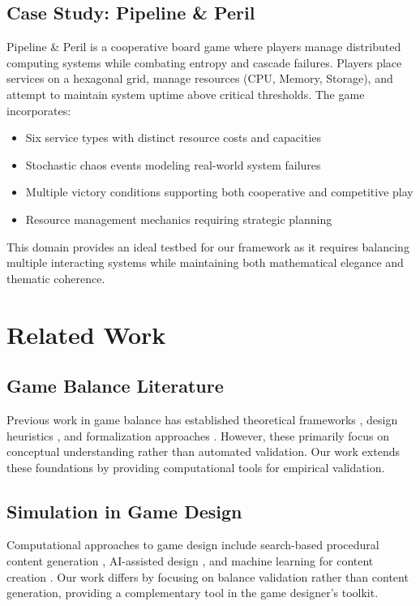 \documentclass[sigconf]{acmart}
\begin{document}
\subsection{Case Study: Pipeline \& Peril}

Pipeline \& Peril is a cooperative board game where players manage distributed computing systems while combating entropy and cascade failures. Players place services on a hexagonal grid, manage resources (CPU, Memory, Storage), and attempt to maintain system uptime above critical thresholds. The game incorporates:

\begin{itemize}
\item Six service types with distinct resource costs and capacities
\item Stochastic chaos events modeling real-world system failures
\item Multiple victory conditions supporting both cooperative and competitive play
\item Resource management mechanics requiring strategic planning
\end{itemize}

This domain provides an ideal testbed for our framework as it requires balancing multiple interacting systems while maintaining both mathematical elegance and thematic coherence.

\section{Related Work}

\subsection{Game Balance Literature}

Previous work in game balance has established theoretical frameworks \cite{sirlin2009balancing}, design heuristics \cite{schreiber2010game}, and formalization approaches \cite{adams2012game}. However, these primarily focus on conceptual understanding rather than automated validation. Our work extends these foundations by providing computational tools for empirical validation.

\subsection{Simulation in Game Design}

Computational approaches to game design include search-based procedural content generation \cite{togelius2011search}, AI-assisted design \cite{yannakakis2018artificial}, and machine learning for content creation \cite{summerville2018procedural}. Our work differs by focusing on balance validation rather than content generation, providing a complementary tool in the game designer's toolkit.
\end{document}
